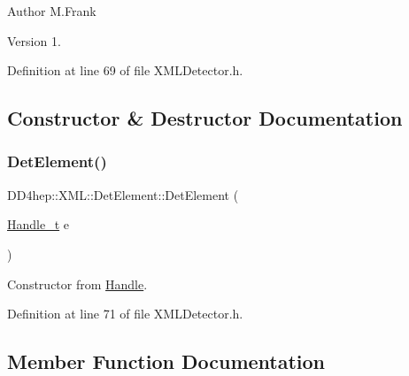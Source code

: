 \begin{DoxyAuthor}{Author}
M.\+Frank 
\end{DoxyAuthor}
\begin{DoxyVersion}{Version}
1. 
\end{DoxyVersion}


Definition at line 69 of file X\+M\+L\+Detector.\+h.



\subsection{Constructor \& Destructor Documentation}
\hypertarget{struct_d_d4hep_1_1_x_m_l_1_1_det_element_af9a3855887f30e3cb111f8c19956c7c6}{}\label{struct_d_d4hep_1_1_x_m_l_1_1_det_element_af9a3855887f30e3cb111f8c19956c7c6} 
\subsubsection{\texorpdfstring{Det\+Element()}{DetElement()}}
{\footnotesize\ttfamily D\+D4hep\+::\+X\+M\+L\+::\+Det\+Element\+::\+Det\+Element (\begin{DoxyParamCaption}\item[{\hyperlink{class_d_d4hep_1_1_x_m_l_1_1_handle__t}{Handle\+\_\+t}}]{e }\end{DoxyParamCaption})\hspace{0.3cm}{\ttfamily [inline]}}



Constructor from \hyperlink{class_d_d4hep_1_1_handle}{Handle}. 



Definition at line 71 of file X\+M\+L\+Detector.\+h.



\subsection{Member Function Documentation}
\hypertarget{struct_d_d4hep_1_1_x_m_l_1_1_det_element_a3de12322c14de0035be56f4a6a5f12ec}{}\label{struct_d_d4hep_1_1_x_m_l_1_1_det_element_a3de12322c14de0035be56f4a6a5f12ec} 
